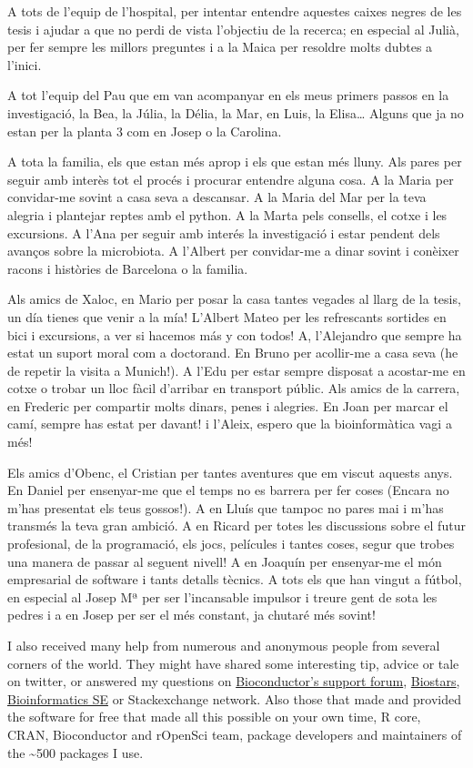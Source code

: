 \documentclass[
  12pt,
  a4paper,
  twoside,
  openright]{book}
\begin{document}
A tots de l'equip de l'hospital, per intentar entendre aquestes caixes negres de les tesis i ajudar a que no perdi de vista l'objectiu de la recerca; en especial al Julià, per fer sempre les millors preguntes i a la Maica per resoldre molts dubtes a l'inici.

A tot l'equip del Pau que em van acompanyar en els meus primers passos en la investigació, la Bea, la Júlia, la Délia, la Mar, en Luis, la Elisa\ldots{}
Alguns que ja no estan per la planta 3 com en Josep o la Carolina.

A tota la familia, els que estan més aprop i els que estan més lluny.
Als pares per seguir amb interès tot el procés i procurar entendre alguna cosa.
A la Maria per convidar-me sovint a casa seva a descansar.
A la Maria del Mar per la teva alegria i plantejar reptes amb el python.
A la Marta pels consells, el cotxe i les excursions.
A l'Ana per seguir amb interés la investigació i estar pendent dels avanços sobre la microbiota.
A l'Albert per convidar-me a dinar sovint i conèixer racons i històries de Barcelona o la familia.

Als amics de Xaloc, en Mario per posar la casa tantes vegades al llarg de la tesis, un día tienes que venir a la mía!
L'Albert Mateo per les refrescants sortides en bici i excursions, a ver si hacemos más y con todos!
A, l'Alejandro que sempre ha estat un suport moral com a doctorand.
En Bruno per acollir-me a casa seva (he de repetir la visita a Munich!).
A l'Edu per estar sempre disposat a acostar-me en cotxe o trobar un lloc fàcil d'arribar en transport públic.
Als amics de la carrera, en Frederic per compartir molts dinars, penes i alegries.
En Joan per marcar el camí, sempre has estat per davant! i l'Aleix, espero que la bioinformàtica vagi a més!

Els amics d'Obenc, el Cristian per tantes aventures que em viscut aquests anys.
En Daniel per ensenyar-me que el temps no es barrera per fer coses (Encara no m'has presentat els teus gossos!).
A en Lluís que tampoc no pares mai i m'has transmés la teva gran ambició.
A en Ricard per totes les discussions sobre el futur profesional, de la programació, els jocs, películes i tantes coses, segur que trobes una manera de passar al seguent nivell!
A en Joaquín per ensenyar-me el món empresarial de software i tants detalls tècnics.
A tots els que han vingut a fútbol, en especial al Josep Mª per ser l'incansable impulsor i treure gent de sota les pedres i a en Josep per ser el més constant, ja chutaré més sovint!

I also received many help from numerous and anonymous people from several corners of the world.
They might have shared some interesting tip, advice or tale on twitter, or answered my questions on \href{https://support.bioconductor.org}{Bioconductor's support forum}, \href{https://biostars.org}{Biostars}, \href{https://bioinformatics.stackexchange.com/}{Bioinformatics SE} or Stackexchange network.
Also those that made and provided the software for free that made all this possible on your own time, R core, CRAN, Bioconductor and rOpenSci team, package developers and maintainers of the \textasciitilde500 packages I use.
\end{document}
